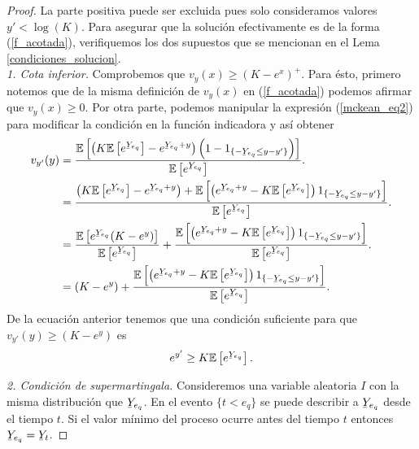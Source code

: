 \begin{proof}
La parte positiva puede ser excluida pues solo consideramos valores $y' < \log(K)$. Para asegurar que la solución efectivamente es de la forma (\ref{f_acotada}), verifiquemos los dos supuestos que se mencionan en el Lema \ref{condiciones_solucion}. \\

\textit{1. Cota inferior.} Comprobemos que $v_y(x) \geq (K - e^{x})^{+}$. Para ésto, primero notemos que de la misma definición de $v_y(x)$ en (\ref{f_acotada}) podemos afirmar que $v_y(x) \geq 0$. Por otra parte, podemos manipular la expresión (\ref{mckean_eq2}) para modificar la condición en la función indicadora y así obtener
\begin{align}
v_{y'}(y) & = \frac{ \mathbb{E} \left[ \left( K  \mathbb{E} \left[ e^{\ubar{Y}_{e_q}} \right] - e^{\ubar{Y}_{e_q} + y} \right) \left( 1 - 1_{\{ - \ubar{Y}_{e_q} \leq y - y'\}} \right) \right] }{ \mathbb{E} \left[ e^{\ubar{Y}_{e_q}} \right] }. \nonumber \\
	& = \frac{ \left( K \mathbb{E} \left[ e^{\ubar{Y}_{e_q}} \right] - e^{\ubar{Y}_{e_q} + y} \right) + \mathbb{E} \left[ \left( e^{\ubar{Y}_{e_q} + y} - K  \mathbb{E} \left[ e^{\ubar{Y}_{e_q}} \right] \right)  1_{\{ - \ubar{Y}_{e_q} \leq y - y'\}}  \right] }{ \mathbb{E} \left[ e^{\ubar{Y}_{e_q}} \right] }. \nonumber \\
    & = \frac{ \mathbb{E} \left[ e^{\ubar{Y}_{e_q}} (K - e^{y}) \right] }{ \mathbb{E} \left[ e^{\ubar{Y}_{e_q}} \right] } + \frac{ \mathbb{E} \left[ \left( e^{\ubar{Y}_{e_q} + y} - K  \mathbb{E} \left[ e^{\ubar{Y}_{e_q}} \right] \right) 1_{\{ - \ubar{Y}_{e_q} \leq y - y'\}} \right] }{ \mathbb{E} \left[ e^{\ubar{Y}_{e_q}} \right] }. \nonumber \\
	& = (K - e^{y}) + \frac{ \mathbb{E} \left[ \left( e^{\ubar{Y}_{e_q} + y} - K  \mathbb{E} \left[ e^{\ubar{Y}_{e_q}} \right] \right) 1_{\{ - \ubar{Y}_{e_q} \leq y - y' \}} \right] }{ \mathbb{E} \left[ e^{\ubar{Y}_{e_q}} \right] }. \label{cont_mckean}
\end{align}
De la ecuación anterior tenemos que una condición suficiente para que $v_{y'}(y) \geq (K - e^{y})$ es
\begin{align}
e^{y'} \geq K \mathbb{E} \left[ e^{\ubar{Y}_{e_q}} \right]. \label{mckean_eq3}
\end{align}

\textit{2. Condición de supermartingala.} Consideremos una variable aleatoria $I$ con la misma distribución que $\ubar{Y}_{e_q}$. En el evento $\{ t < e_q \}$ se puede describir a $\ubar{Y}_{e_q}$ desde el tiempo $t$. Si el valor mínimo del proceso ocurre antes del tiempo $t$ entonces $\ubar{Y}_{e_q} = \ubar{Y}_{t}$. 


\end{proof}
